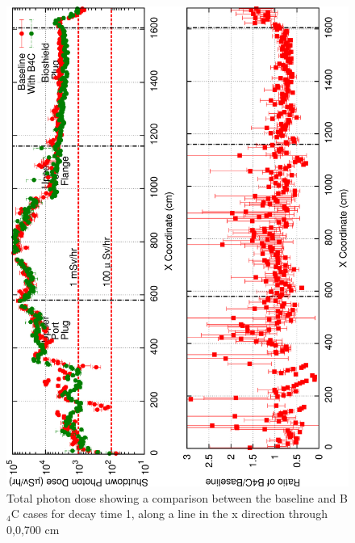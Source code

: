 \documentclass[12pt]{article}
\begin{document}
\begin{figure}[ht!]
\centering
\includegraphics[angle=-90,clip,scale=0.15]{../plots/photon_lineout/dc1_z700_lineout.png}
\caption{Total photon dose showing a comparison between the baseline and B$_4$C cases for decay time 1,
                 along a line in the x direction through 0,0,700 cm}
\label{fig:photons_dc1_total_dose_lineout_z700}
\end{figure}
\end{document}
